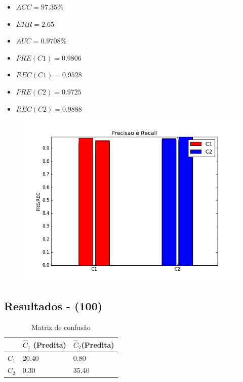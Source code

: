 \documentclass[11pt,a4paper]{article}
\numberwithin{equation}{section}
\begin{document}
\begin{minipage}{.5\textwidth}
\begin{itemize}
\item $ACC = 97.35 \%$
\item $ERR =  2.65$
\item $AUC = 0.9708 \%$
\item $PRE(C1) = 0.9806$
\item $REC(C1) = 0.9528$
\item $PRE(C2) = 0.9725$
\item $REC(C2) = 0.9888$
\end{itemize}
\end{minipage}%
\begin{minipage}{.5\textwidth}
\begin{figure}[H]
\centering
  \includegraphics[width=\linewidth]{../img/mlp_rec.png}
  \label{fig:percep}
\end{figure}
\end{minipage}%

\subsection{Resultados - (100)}

\begin{table}[H]
\centering
\caption{Matriz de confusão}
\begin{tabular}{l l l}
\hline
 & \textbf{$\hat{C}_1$ (Predita)} & \textbf{$\hat{C}_2$(Predita)}\\
\hline
$C_1$ & 20.40 & 0.80 \\
$C_2$ & 0.30  & 35.40\\ 
\hline
\end{tabular}
\end{table}
\end{document}
